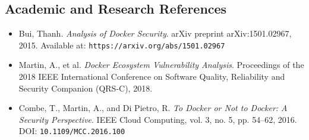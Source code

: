 \subsection{Academic and Research References}

\begin{itemize}

    \item Bui, Thanh.
    \textit{Analysis of Docker Security}.
    arXiv preprint arXiv:1501.02967, 2015.
    Available at: \texttt{https://arxiv.org/abs/1501.02967}

    \item Martin, A., et al.
    \textit{Docker Ecosystem Vulnerability Analysis}.
    Proceedings of the 2018 IEEE International Conference on
    Software Quality, Reliability and Security Companion
    (QRS-C), 2018.

    \item Combe, T., Martin, A., and Di Pietro, R.
    \textit{To Docker or Not to Docker: A Security Perspective}.
    IEEE Cloud Computing, vol. 3, no. 5, pp. 54--62, 2016.
    DOI: \texttt{10.1109/MCC.2016.100}

\end{itemize}